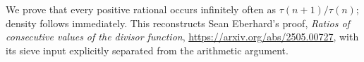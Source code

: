 We prove that every positive rational occurs infinitely often as $\tau(n+1)/\tau(n)$; density follows immediately. This reconstructs Sean Eberhard's proof, \emph{Ratios of consecutive values of the divisor function}, \url{https://arxiv.org/abs/2505.00727}, with its sieve input explicitly separated from the arithmetic argument.
